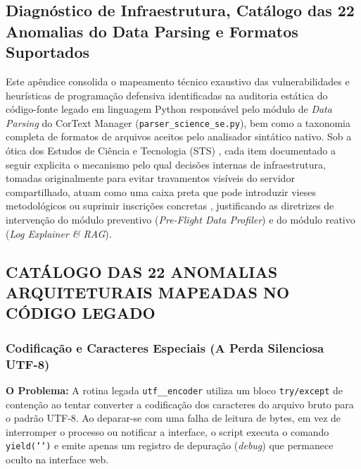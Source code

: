 \documentclass[
	oneside,
	a4paper,
	12pt,
	chapter=TITLE,
	section=TITLE,
	english,
	brazilian
]{abntex2}
\begin{document}
\postextual




\begin{apendicesenv}
\partapendices

\chapter{Diagnóstico de Infraestrutura, Catálogo das 22 Anomalias do Data Parsing e Formatos Suportados}\label{sec:diagnostico_de_infraestrutura_catalogo_d}


Este apêndice consolida o mapeamento técnico exaustivo das vulnerabilidades e heurísticas de programação defensiva identificadas na auditoria estática do código-fonte legado em linguagem Python responsável pelo módulo de \textit{Data Parsing} do CorText Manager (\texttt{parser\_\allowbreak science\_\allowbreak se.\allowbreak py}), bem como a taxonomia completa de formatos de arquivos aceitos pelo analisador sintático nativo. Sob a ótica dos Estudos de Ciência e Tecnologia (STS) \cite{Latour1987,Bowker1999}, cada item documentado a seguir explicita o mecanismo pelo qual decisões internas de infraestrutura, tomadas originalmente para evitar travamentos visíveis do servidor compartilhado, atuam como uma caixa preta que pode introduzir vieses metodológicos ou suprimir inscrições concretas \cite{Abdo2021}, justificando as diretrizes de intervenção do módulo preventivo (\textit{Pre-Flight Data Profiler}) e do módulo reativo (\textit{Log Explainer \& RAG}).

\FloatBarrier
\section{CATÁLOGO DAS 22 ANOMALIAS ARQUITETURAIS MAPEADAS NO CÓDIGO LEGADO}\label{sec:catalogo_das_22_anomalias_arquiteturais_}


\FloatBarrier
\subsection{Codificação e Caracteres Especiais (A Perda Silenciosa UTF-8)}\label{sec:codificacao_e_caracteres_especiais_a_per}


\textbf{O Problema:} A rotina legada \texttt{utf\_\_\allowbreak encoder} utiliza um bloco \texttt{try/\allowbreak except} de contenção ao tentar converter a codificação dos caracteres do arquivo bruto para o padrão UTF-8. Ao deparar-se com uma falha de leitura de bytes, em vez de interromper o processo ou notificar a interface, o script executa o comando \texttt{yield('{}')} e emite apenas um registro de depuração (\textit{debug}) que permanece oculto na interface web.


\end{apendicesenv}
\end{document}
